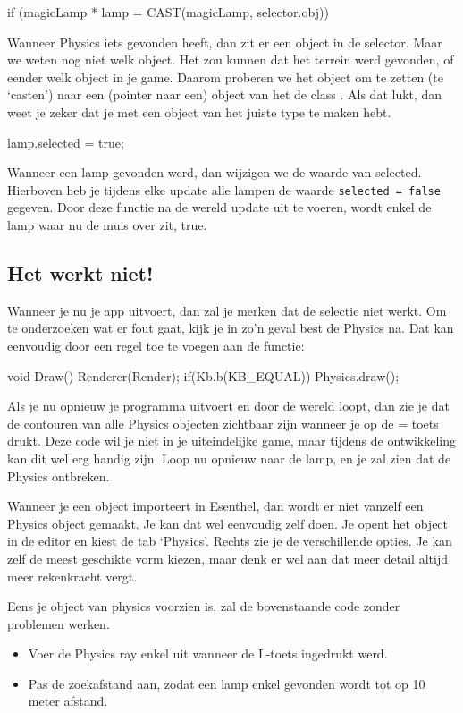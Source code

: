 \begin{code}
if (magicLamp * lamp = CAST(magicLamp, selector.obj))
\end{code}

Wanneer Physics iets gevonden heeft, dan zit er een object in de selector. Maar we weten nog niet welk object. Het zou kunnen dat het terrein werd gevonden, of eender welk object in je game. Daarom proberen we het object om te zetten (te `casten') naar een (pointer naar een) object van het de class . Als dat lukt, dan weet je zeker dat je met een object van het juiste type te maken hebt.

\begin{code}
lamp.selected = true;
\end{code}

Wanneer een lamp gevonden werd, dan wijzigen we de waarde van selected. Hierboven heb je tijdens elke update alle lampen de waarde \texttt{selected = false} gegeven. Door deze functie na de wereld update uit te voeren, wordt enkel de lamp waar nu de muis over zit, true.

\subsection{Het werkt niet!}
Wanneer je nu je app uitvoert, dan zal je merken dat de selectie niet werkt. Om te onderzoeken wat er fout gaat, kijk je in zo'n geval best de Physics na. Dat kan eenvoudig door een regel toe te voegen aan de  functie:

\begin{code}
void Draw() {
   Renderer(Render);
	 if(Kb.b(KB_EQUAL)) Physics.draw();
}
\end{code}

Als je nu opnieuw je programma uitvoert en door de wereld loopt, dan zie je dat de contouren van alle Physics objecten zichtbaar zijn wanneer je op de = toets drukt. Deze code wil je niet in je uiteindelijke game, maar tijdens de ontwikkeling kan dit wel erg handig zijn. Loop nu opnieuw naar de lamp, en je zal zien dat de Physics ontbreken. 

Wanneer je een object importeert in Esenthel, dan wordt er niet vanzelf een Physics object gemaakt. Je kan dat wel eenvoudig zelf doen. Je opent het object in de editor en kiest de tab `Physics'. Rechts zie je de verschillende opties. Je kan zelf de meest geschikte vorm kiezen, maar denk er wel aan dat meer detail altijd meer rekenkracht vergt.

Eens je object van physics voorzien is, zal de bovenstaande code zonder problemen werken.

\begin{exercise}
	\begin{itemize}
		\item Voer de Physics ray enkel uit wanneer de L-toets ingedrukt werd.
		\item Pas de zoekafstand aan, zodat een lamp enkel gevonden wordt tot op 10 meter afstand.
	\end{itemize}
\end{exercise}






